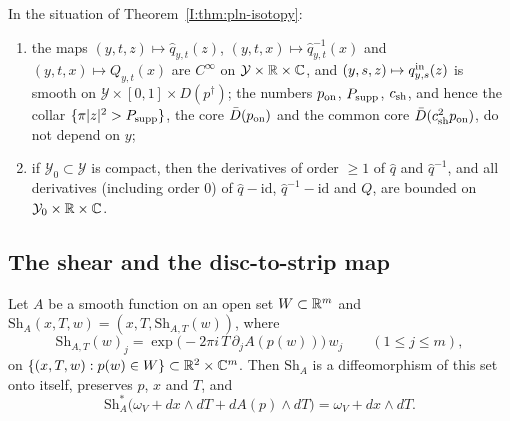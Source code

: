 \begin{theorem}\label{I:thm:pln-param}
In the situation of Theorem~\ref{I:thm:pln-isotopy}:
\begin{enumerate}[label=(\alph*)]
\item the maps $(y,t,z)\mapsto\hat q_{y,t}(z)$, $(y,t,x)\mapsto\hat q_{y,t}^{-1}(x)$ and $(y,t,x)\mapsto Q_{y,t}(x)$ are $C^\infty$ on
 $\mathcal Y\times\mathbb{R}\times\mathbb{C}$, and $(y,s,z)\mapsto q^{\rm in}_{y,s}(z)$ is smooth on $\mathcal Y\times[0,1]\times D(p^\dagger)$; the
 numbers $p_{\rm on}$, $P_{\rm supp}$, $c_{\rm sh}$, and hence the collar $\{\pi|z|^2>P_{\rm supp}\}$, the core $\bar D(p_{\rm on})$ and the
 common core $\bar D(c_{\rm sh}^2p_{\rm on})$, do not depend on $y$;
\item if $\mathcal Y_0\subset\mathcal Y$ is compact, then the derivatives of order $\ge1$ of $\hat q$ and $\hat q^{-1}$, and all
 derivatives (including order $0$) of $\hat q-\mathrm{id}$, $\hat q^{-1}-\mathrm{id}$ and $Q$, are bounded on
 $\mathcal Y_0\times\mathbb{R}\times\mathbb{C}$.
\end{enumerate}
\end{theorem}

\subsection{The shear and the disc-to-strip map}

\begin{lemma}\label{I:lem:hdl-shear}
Let $A$ be a smooth function on an open set $W\subset\mathbb{R}^m$ and $\mathrm{Sh}_A(x,T,w)=(x,T,\mathrm{Sh}_{A,T}(w))$, where
\[
 \mathrm{Sh}_{A,T}(w)_j=\exp\big(-2\pi i\,T\,\partial_jA(p(w))\big)\,w_j\qquad(1\le j\le m),
\]
on $\{(x,T,w):p(w)\in W\}\subset\mathbb{R}^2\times\mathbb{C}^m$. Then $\mathrm{Sh}_A$ is a diffeomorphism of this set onto itself, preserves
$p$, $x$ and $T$, and
\[
 \mathrm{Sh}_A^*\big(\omega_V+dx\wedge dT+dA(p)\wedge dT\big)=\omega_V+dx\wedge dT .
\]
\end{lemma}

